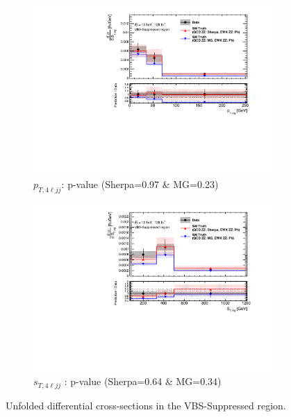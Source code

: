 \begin{figure}[!htb]
\begin{subfigure}{.49\textwidth}
        \includegraphics[width=.98\linewidth]{figures/Results/CrossSection_VBSSuppressed/xs_ptzzjj_CR.pdf}
        \caption{ \footnotesize{$p_{T,4\ell jj}$}: p-value (Sherpa=0.97 $\&$ MG=0.23)}
    \end{subfigure}
    \begin{subfigure}{.49\textwidth}
        \centering
        \includegraphics[width=.98\linewidth]{figures/Results/CrossSection_VBSSuppressed/xs_stzzjj_CR.pdf}
        \caption{ \footnotesize{$s_{T, 4\ell jj}$ }: p-value (Sherpa=0.64 $\&$ MG=0.34)}
    \end{subfigure}
    \caption{Unfolded differential cross-sections in the VBS-Suppressed region.}  \label{fig:unfolded_xs_VBS_Suppressed_a}
\end{figure}


